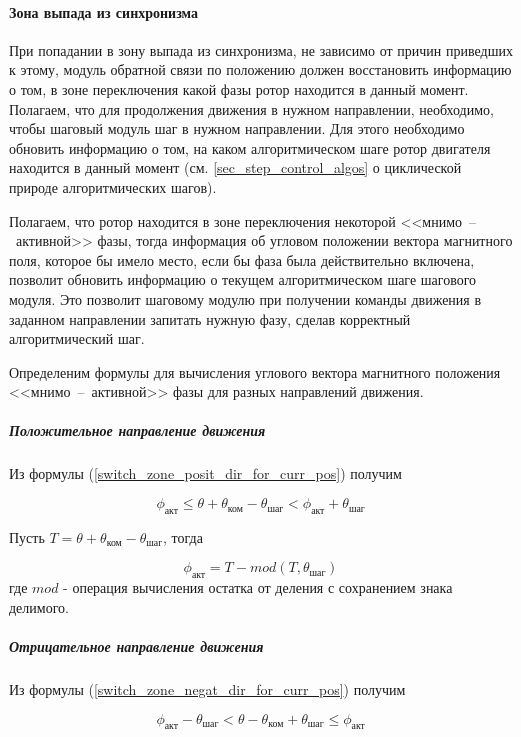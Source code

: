 \paragraph{Зона выпада из синхронизма}
При попадании в зону выпада из синхронизма, не зависимо от причин приведших к этому,
модуль обратной связи по положению должен восстановить информацию о том,
в зоне переключения какой фазы ротор находится в данный момент. Полагаем, что для
продолжения движения в нужном направлении, необходимо, чтобы шаговый модуль
шаг в нужном направлении. Для этого необходимо обновить информацию о том, на каком
алгоритмическом шаге ротор двигателя находится в данный момент
(см. \ref{sec_step_control_algos} о циклической природе алгоритмических шагов).

Полагаем, что ротор находится в зоне переключения некоторой <<мнимо~--~активной>> фазы,
тогда информация об угловом положении вектора магнитного поля, которое бы имело место,
если бы фаза была действительно включена, позволит обновить информацию о текущем
алгоритмическом шаге шагового модуля. Это позволит шаговому модулю при получении
команды движения в заданном направлении запитать нужную фазу, сделав корректный
алгоритмический шаг.

Определеним формулы для вычисления углового вектора магнитного положения
<<мнимо~--~активной>> фазы для разных направлений движения.

\subparagraph{Положительное направление движения}

Из формулы (\ref{switch_zone_posit_dir_for_curr_pos}) получим

\begin{equation}
    \label{sync_restore_posit_dir_active_pole_pos_conditions}
    \phi_\textit{акт}
    \leq \theta + \theta_\textit{ком} - \theta_\textit{шаг}
    < \phi_\textit{акт} + \theta_\textit{шаг}
\end{equation}

Пусть $T = \theta + \theta_\textit{ком} - \theta_\textit{шаг}$, тогда

\begin{equation}
    \label{sync_restore_posit_dir_active_pole_pos}
    \phi_\textit{акт} = T - mod(T, \theta_\textit{шаг})
\end{equation}
где $mod$ - операция вычисления остатка от деления с сохранением знака делимого.

\subparagraph{Отрицательное направление движения}
Из формулы (\ref{switch_zone_negat_dir_for_curr_pos}) получим

\begin{equation}
    \label{sync_restore_negat_dir_active_pole_pos_conditions}
    \phi_\textit{акт} - \theta_\textit{шаг}
    < \theta - \theta_\textit{ком} + \theta_\textit{шаг}
    \leq \phi_\textit{акт}
\end{equation}


